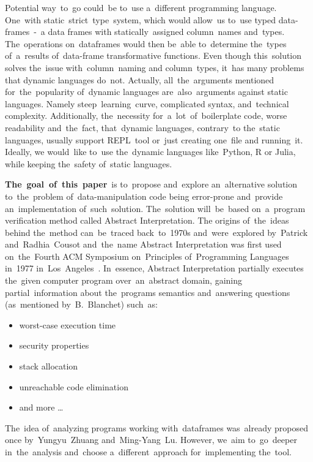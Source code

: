 Potential way~to~go could~be to~use a~different programming language.
One~with static~strict~type~system, which would allow~us to~use typed data-frames~-~a data frames with statically~assigned
column~names and~types.
The~operations on~dataframes would then be~able to~determine the~types of~a~results of~data-frame transformative functions.
Even though this~solution solves the~issue with~column~naming and column~types, it~has many problems that dynamic
languages do~not.
Actually, all~the~arguments mentioned for~the~popularity of~dynamic languages are~also~arguments against static languages.
Namely steep~learning~curve, complicated syntax, and~technical complexity.
Additionally, the~necessity for~a~lot~of~boilerplate code, worse readability and~the~fact, that~dynamic languages,
contrary~to the~static languages, usually support REPL~tool or~just creating one~file and running~it.
Ideally, we would~like to~use the~dynamic languages like~Python, R or Julia, while keeping the~safety of~static languages.

\textbf{The~goal~of~this~paper}~is to~propose and~explore an~alternative solution to~the~problem of~data-manipulation
code being error-prone and~provide an~implementation of~such~solution.
The~solution will~be~based on~a~program verification method called Abstract Interpretation.
The origins of~the~ideas behind the~method can~be~traced back~to~1970s and~were~explored by~Patrick and~Radhia~Cousot
and~the~name Abstract Interpretation was first used on~the~Fourth ACM
Symposium on~Principles of~Programming Languages in~1977 in~Los~Angeles~\cite{Cousot:1977:AI}.
In~essence, Abstract Interpretation partially executes the~given computer program over~an~abstract domain, gaining
partial~information about the~programs semantics and~answering questions (as~mentioned
by~B.~Blanchet\cite{Blanchet:2002:AI}) such~as:
\begin{itemize}
    \item worst-case execution time
    \item security properties
    \item stack allocation
    \item unreachable code elimination
    \item and more \ldots
\end{itemize}

The~idea of~analyzing programs working with~dataframes was~already proposed once by~Yungyu~Zhuang
and~Ming-Yang~Lu\cite{Zhuang:2022:TypeChecking}.
However, we~aim to~go~deeper in~the~analysis and~choose a~different~approach for~implementing the~tool.

